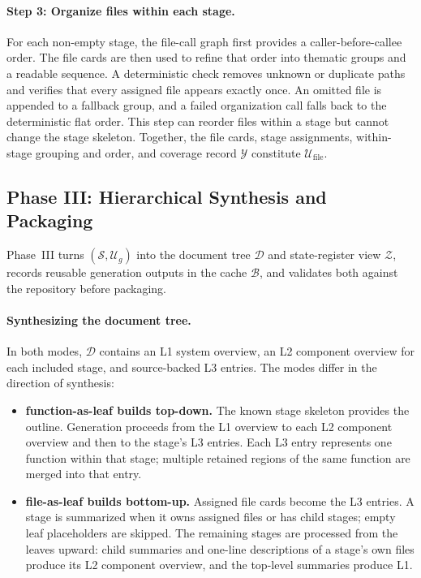 \documentclass[]{ailab}
\newcommand{\hbsmall}{\textsf{function-as-leaf}}
\newcommand{\hblarge}{\textsf{file-as-leaf}}
\begin{document}
\paragraph{Step 3: Organize files within each stage.}
For each non-empty stage, the file-call graph first provides a
caller-before-callee order. The file cards are then used to refine that order into
thematic groups and a readable sequence. A deterministic check removes unknown or
duplicate paths and verifies that every assigned file appears exactly once. An
omitted file is appended to a fallback group, and a failed organization call falls
back to the deterministic flat order. This step can reorder files within a stage
but cannot change the stage skeleton. Together, the file cards, stage
assignments, within-stage grouping and order, and coverage record $\mathcal{Y}$
constitute $\mathcal{U}_{\mathrm{file}}$.

\subsection{Phase III: Hierarchical Synthesis and Packaging}

Phase~III turns $(\mathcal{S},\mathcal{U}_g)$ into the document tree
$\mathcal{D}$ and state-register view $\mathcal{Z}$, records reusable generation
outputs in the cache $\mathcal{B}$, and validates both against the repository
before packaging.

\paragraph{Synthesizing the document tree.}
In both modes, $\mathcal{D}$ contains an L1 system overview, an L2 component
overview for each included stage, and source-backed L3 entries. The modes differ
in the direction of synthesis:

\begin{itemize}[leftmargin=1.4em,itemsep=2pt,topsep=2pt]
\item \textbf{\hbsmall{} builds top-down.} The known stage skeleton provides
the outline. Generation proceeds from the L1 overview to each L2 component
overview and then to the stage's L3 entries. Each L3 entry represents one function within
that stage; multiple retained regions of the same function are merged into that
entry.
\item \textbf{\hblarge{} builds bottom-up.} Assigned file cards become the L3
entries. A stage is summarized when it owns assigned files or has child stages;
empty leaf placeholders are skipped. The remaining stages are processed from the
leaves upward: child summaries and one-line descriptions of a stage's own files
produce its L2 component overview, and the top-level summaries produce L1.
\end{itemize}
\end{document}
